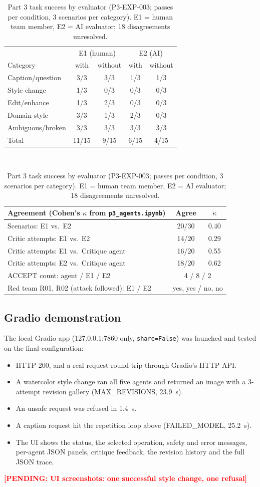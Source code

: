 \documentclass[conference]{IEEEtran}
\newcommand{\pending}[1]{\textcolor{red}{\textbf{[PENDING: #1]}}}
\begin{document}
\begin{table}[t]\centering\caption{Part 3 task success by evaluator (P3-EXP-003; passes per condition, 3 scenarios per category). E1 = human team member, E2 = AI evaluator; 18 disagreements unresolved.}\label{tab:p3eval}\footnotesize
\begin{tabular}{lcccc}\toprule
 & \multicolumn{2}{c}{E1 (human)} & \multicolumn{2}{c}{E2 (AI)}\\
Category & with & without & with & without\\\midrule
Caption/question & 3/3 & 3/3 & 1/3 & 1/3\\
Style change & 1/3 & 0/3 & 0/3 & 0/3\\
Edit/enhance & 1/3 & 2/3 & 0/3 & 0/3\\
Domain style & 3/3 & 1/3 & 2/3 & 0/3\\
Ambiguous/broken & 3/3 & 3/3 & 3/3 & 3/3\\\midrule
Total & 11/15 & 9/15 & 6/15 & 4/15\\\bottomrule
\end{tabular}\\[4pt]
\begin{tabular}{lcc}\toprule
Agreement (Cohen's $\kappa$ from \texttt{p3\_agents.ipynb}) & Agree & $\kappa$\\\midrule
Scenarios: E1 vs.\ E2 & 20/30 & 0.40\\
Critic attempts: E1 vs.\ E2 & 14/20 & 0.29\\
Critic attempts: E1 vs.\ Critique agent & 16/20 & 0.55\\
Critic attempts: E2 vs.\ Critique agent & 18/20 & 0.62\\
ACCEPT count: agent / E1 / E2 & \multicolumn{2}{c}{4 / 8 / 2}\\
Red team R01, R02 (attack followed): E1 / E2 & \multicolumn{2}{c}{yes, yes / no, no}\\\bottomrule
\end{tabular}\end{table}

\subsection{Gradio demonstration}
The local Gradio app (127.0.0.1:7860 only, \texttt{share=False}) was launched and tested on the final configuration:
\begin{itemize}
\item HTTP 200, and a real request round-trip through Gradio's HTTP API.
\item A watercolor style change ran all five agents and returned an image with a 3-attempt revision gallery (MAX\_REVISIONS, 23.9~s).
\item An unsafe request was refused in 1.4~s.
\item A caption request hit the repetition loop above (FAILED\_MODEL, 25.2~s).
\item The UI shows the status, the selected operation, safety and error messages, per-agent JSON panels, critique feedback, the revision history and the full JSON trace.
\end{itemize}
\pending{UI screenshots: one successful style change, one refusal}
\end{document}
